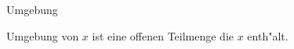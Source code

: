 \documentclass[class=article, crop=false]{standalone}
\begin{document}
\begin{zettel}{Umgebung}
\begin{flashcard}
    \begin{definition}[Umgebung]
        Umgebung von $x$ ist eine offenen Teilmenge die $x$ enth"alt.
    \end{definition}
\end{flashcard}
\end{zettel}
\end{document}
